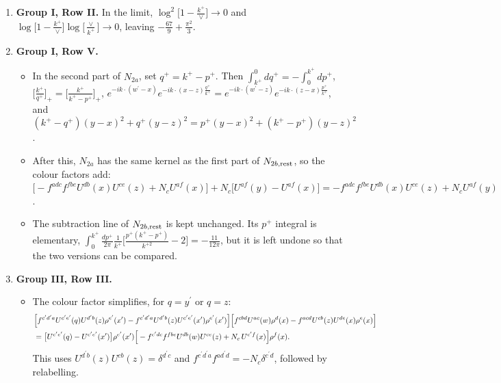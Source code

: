 \documentclass[10pt]{article}
\numberwithin{equation}{section}
\begin{document}
\begin{enumerate}
\item \textbf{Group I, Row II.} In the limit, $\log^{2}\big[1-\frac{k^{+}}{\vee}\big]\to0$ and $\log\big[1-\frac{k^{+}}{\vee}\big]\log\big[\frac{\vee}{k^{+}}\big]\to0$, leaving $-\frac{67}{9}+\frac{\pi^{2}}{3}$.
\item \textbf{Group I, Row V.}
\begin{itemize}
\item In the second part of $N_{2a}$, set $q^{+}=k^{+}-p^{+}$. Then $\int_{k^{+}}^{0}dq^{+}=-\int_{0}^{k^{+}}dp^{+}$, $\big[\frac{k^{+}}{q^{+}}\big]_{+}=\big[\frac{k^{+}}{k^{+}-p^{+}}\big]_{+}$, $e^{-ik\cdot(w^{\prime}-x)}e^{-ik\cdot(x-z)\frac{q^{+}}{k^{+}}}=e^{-ik\cdot(w^{\prime}-z)}e^{-ik\cdot(z-x)\frac{p^{+}}{k^{+}}}$, and $(k^{+}-q^{+})(y-x)^{2}+q^{+}(y-z)^{2}=p^{+}(y-x)^{2}+(k^{+}-p^{+})(y-z)^{2}$.
\item After this, $N_{2a}$ has the same kernel as the first part of $N_{2b,\rm rest}$, so the colour factors add: $\big[-f^{adc}f^{fbe}U^{db}(x)U^{ce}(z)+N_{c}U^{af}(x)\big]+N_{c}\big[U^{af}(y)-U^{af}(x)\big]=-f^{adc}f^{fbe}U^{db}(x)U^{ce}(z)+N_{c}U^{af}(y)$.
\item The subtraction line of $N_{2b,\rm rest}$ is kept unchanged. Its $p^{+}$ integral is elementary, $\int_{0}^{k^{+}}\frac{dp^{+}}{2\pi}\frac{1}{k^{+}}\big[\frac{p^{+}(k^{+}-p^{+})}{k^{+2}}-2\big]=-\frac{11}{12\pi}$, but it is left undone so that the two versions can be compared.
\end{itemize}
\item \textbf{Group III, Row III.}
\begin{itemize}
\item The colour factor simplifies, for $q=y^{\prime}$ or $q=z$:
\begin{align}
&\Big[f^{c^{\prime}d^{\prime}a}U^{c^{\prime}e^{\prime}}(q)U^{d^{\prime}b}(z)\rho^{e^{\prime}}(x^{\prime})-f^{c^{\prime}d^{\prime}a}U^{d^{\prime}b}(z)U^{c^{\prime}e^{\prime}}(x^{\prime})\rho^{e^{\prime}}(x^{\prime})\Big]\Big[f^{cbd}U^{ac}(w)\rho^{d}(x)-f^{acd}U^{cb}(z)U^{de}(x)\rho^{e}(x)\Big]\notag\\
&=\big[U^{c^{\prime}e^{\prime}}(q)-U^{c^{\prime}e^{\prime}}(x^{\prime})\big]\rho^{e^{\prime}}(x^{\prime})\Big[-f^{c^{\prime}dc}f^{fbe}U^{db}(w)U^{ce}(z)+N_{c}\,U^{c^{\prime}f}(x)\Big]\rho^{f}(x).
\end{align}
This uses $U^{d^{\prime}b}(z)U^{cb}(z)=\delta^{d^{\prime}c}$ and $f^{c^{\prime}d^{\prime}a}f^{ad^{\prime}d}=-N_{c}\delta^{c^{\prime}d}$, followed by relabelling.

\end{itemize}
\end{enumerate}
\end{document}
